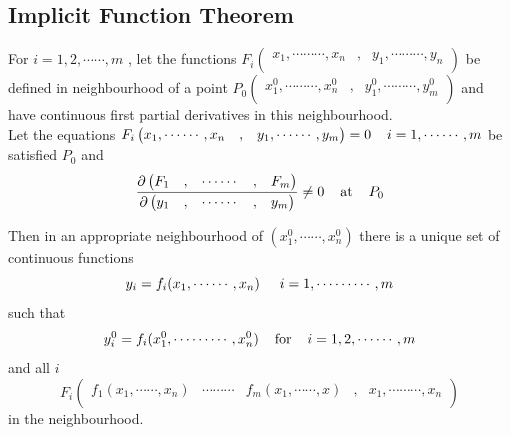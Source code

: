 \documentclass[11pt,a4paper]{article}
\theoremstyle{definition}
\begin{document}
{\color[wave]{485}\subsection{Implicit Function Theorem}}
For $i = 1,2,\cdots\cdots , m$ , let the functions $F_i\begin{pmatrix}
x_1,\cdots\cdots\cdots,x_n & , & y_1,\cdots\cdots\cdots,y_n\\
\end{pmatrix}$ be defined in neighbourhood of a point $P_0\begin{pmatrix}
x_1^0,\cdots\cdots\cdots,x_n^0& , & y_1^0,\cdots\cdots\cdots, y_m^0\\
\end{pmatrix}$ and have continuous first partial derivatives in this neighbourhood.\\

Let the equations $F_i \begin{pmatrix}
x_1,\cdots\cdots,x_n & , & y_1,\cdots\cdots,y_m\\
\end{pmatrix}  = 0\hspace{0.4cm} i= 1,\cdots\cdots,m$ be satisfied $P_0$ and $$\frac{\partial
\begin{pmatrix}
F_1 & , & \cdots\cdots & , & F_m\\
\end{pmatrix}
}{\partial
\begin{pmatrix}
y_1 & , & \cdots\cdots & , & y_m\\
\end{pmatrix}}
\neq 0 \hspace{0.4cm}\text{at}\hspace{0.4cm} P_0\\
$$

Then in an appropriate neighbourhood of $(x^0_1,\cdots\cdots, x^0_n)$ there is a unique set of continuous functions $$y_i = f_i (x_1, \cdots\cdots,x_n) \hspace{0.5cm} i = 1,\cdots\cdots\cdots, m$$
such that
$$y_i^0 = f_i (x^0_1,\cdots\cdots\cdots,x^0_n)\hspace{0.4cm} \text{for}\hspace{0.4cm} i = 1,2,\cdots\cdots, m$$ and all $i$
$$F_i\begin{pmatrix}
f_1(x_1,\cdots\cdots,x_n) & \cdots\cdots\cdots & f_m(x_1,\cdots\cdots, x) & , & x_1,\cdots\cdots\cdots, x_n\\
\end{pmatrix}$$ in the neighbourhood.\\
\end{document}
